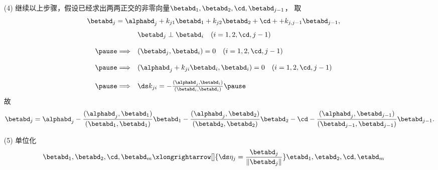 \begin{frame}
  \begin{center}
  \end{center}  

  \begin{itemize}
  \item[(4)] 继续以上步骤，假设已经求出两两正交的非零向量$\betabd_1,\betabd_2,\cd,\betabd_{j-1}$，\pause
    取
    $$
    \betabd_j=\alphabd_j+k_{j1}\betabd_1+k_{j2}\betabd_2+\cd++k_{j,j-1}\betabd_{j-1},
    $$\pause
    $$
    \begin{array}{rl}
      & \betabd_j \perp \betabd_i\quad (i=1,2,\cd,j-1)\\[0.4cm] \pause
      \Longrightarrow &(\betabd_j,\betabd_i)=0 \quad (i=1,2,\cd,j-1)\\[0.4cm] \pause
      \Longrightarrow &(\alphabd_j+k_{ji}\betabd_i,\betabd_i)=0 \quad (i=1,2,\cd,j-1)\\[0.4cm] \pause
      \Longrightarrow& \ds k_{ji}=-\frac{(\alphabd_j,\betabd_i)}{(\betabd_i,\betabd_i)} \pause
    \end{array}
    $$
    故
    $$
    \betabd_j=\alphabd_j-\frac{(\alphabd_j,\betabd_1)}{(\betabd_1,\betabd_1)}\betabd_1
    -\frac{(\alphabd_j,\betabd_2)}{(\betabd_2,\betabd_2)}\betabd_2
    -\cd
    -\frac{(\alphabd_j,\betabd_{j-1})}{(\betabd_{j-1},\betabd_{j-1})}\betabd_{j-1}.
    $$
  \end{itemize}  
\end{frame}


\begin{frame}  
  \begin{center}
  \end{center}  

  \begin{itemize}
  \item[(5)] 单位化
    $$
    \betabd_1, \betabd_2, \cd, \betabd_m \xlongrightarrow[]{\ds \eta_j=\frac{\betabd_j}{\|\betabd_j\|}}
    \etabd_1, \etabd_2, \cd, \etabd_m
    $$
  \end{itemize}  
\end{frame}


